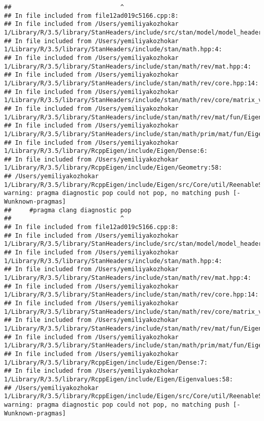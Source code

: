 \documentclass[]{article}
\begin{document}
\begin{verbatim}
##                              ^
## In file included from file12ad019c5166.cpp:8:
## In file included from /Users/yemiliyakozhokar 1/Library/R/3.5/library/StanHeaders/include/src/stan/model/model_header.hpp:4:
## In file included from /Users/yemiliyakozhokar 1/Library/R/3.5/library/StanHeaders/include/stan/math.hpp:4:
## In file included from /Users/yemiliyakozhokar 1/Library/R/3.5/library/StanHeaders/include/stan/math/rev/mat.hpp:4:
## In file included from /Users/yemiliyakozhokar 1/Library/R/3.5/library/StanHeaders/include/stan/math/rev/core.hpp:14:
## In file included from /Users/yemiliyakozhokar 1/Library/R/3.5/library/StanHeaders/include/stan/math/rev/core/matrix_vari.hpp:4:
## In file included from /Users/yemiliyakozhokar 1/Library/R/3.5/library/StanHeaders/include/stan/math/rev/mat/fun/Eigen_NumTraits.hpp:4:
## In file included from /Users/yemiliyakozhokar 1/Library/R/3.5/library/StanHeaders/include/stan/math/prim/mat/fun/Eigen.hpp:4:
## In file included from /Users/yemiliyakozhokar 1/Library/R/3.5/library/RcppEigen/include/Eigen/Dense:6:
## In file included from /Users/yemiliyakozhokar 1/Library/R/3.5/library/RcppEigen/include/Eigen/Geometry:58:
## /Users/yemiliyakozhokar 1/Library/R/3.5/library/RcppEigen/include/Eigen/src/Core/util/ReenableStupidWarnings.h:10:30: warning: pragma diagnostic pop could not pop, no matching push [-Wunknown-pragmas]
##     #pragma clang diagnostic pop
##                              ^
## In file included from file12ad019c5166.cpp:8:
## In file included from /Users/yemiliyakozhokar 1/Library/R/3.5/library/StanHeaders/include/src/stan/model/model_header.hpp:4:
## In file included from /Users/yemiliyakozhokar 1/Library/R/3.5/library/StanHeaders/include/stan/math.hpp:4:
## In file included from /Users/yemiliyakozhokar 1/Library/R/3.5/library/StanHeaders/include/stan/math/rev/mat.hpp:4:
## In file included from /Users/yemiliyakozhokar 1/Library/R/3.5/library/StanHeaders/include/stan/math/rev/core.hpp:14:
## In file included from /Users/yemiliyakozhokar 1/Library/R/3.5/library/StanHeaders/include/stan/math/rev/core/matrix_vari.hpp:4:
## In file included from /Users/yemiliyakozhokar 1/Library/R/3.5/library/StanHeaders/include/stan/math/rev/mat/fun/Eigen_NumTraits.hpp:4:
## In file included from /Users/yemiliyakozhokar 1/Library/R/3.5/library/StanHeaders/include/stan/math/prim/mat/fun/Eigen.hpp:4:
## In file included from /Users/yemiliyakozhokar 1/Library/R/3.5/library/RcppEigen/include/Eigen/Dense:7:
## In file included from /Users/yemiliyakozhokar 1/Library/R/3.5/library/RcppEigen/include/Eigen/Eigenvalues:58:
## /Users/yemiliyakozhokar 1/Library/R/3.5/library/RcppEigen/include/Eigen/src/Core/util/ReenableStupidWarnings.h:10:30: warning: pragma diagnostic pop could not pop, no matching push [-Wunknown-pragmas]

\end{verbatim}
\end{document}
